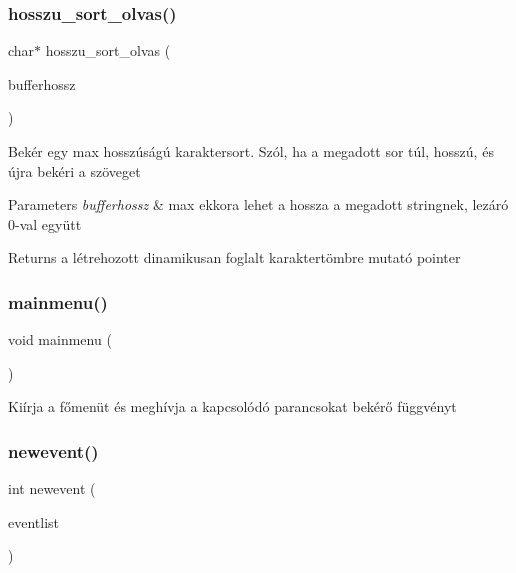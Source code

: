 \subsubsection{\texorpdfstring{hosszu\+\_\+sort\+\_\+olvas()}{hosszu\_sort\_olvas()}}
{\footnotesize\ttfamily char$\ast$ hosszu\+\_\+sort\+\_\+olvas (\begin{DoxyParamCaption}\item[{int}]{bufferhossz }\end{DoxyParamCaption})}

Bekér egy max hosszúságú karaktersort. Szól, ha a megadott sor túl, hosszú, és újra bekéri a szöveget 
\begin{DoxyParams}{Parameters}
{\em bufferhossz} & max ekkora lehet a hossza a megadott stringnek, lezáró 0-\/val együtt \\
\hline
\end{DoxyParams}
\begin{DoxyReturn}{Returns}
a létrehozott dinamikusan foglalt karaktertömbre mutató pointer 
\end{DoxyReturn}
\mbox{\label{group__menu_gac86d3169260f5cacd0f792743957b054}} 
\subsubsection{\texorpdfstring{mainmenu()}{mainmenu()}}
{\footnotesize\ttfamily void mainmenu (\begin{DoxyParamCaption}{ }\end{DoxyParamCaption})}

Kiírja a főmenüt és meghívja a kapcsolódó parancsokat bekérő függvényt \mbox{\label{group__menu_ga069c1b762e46bba28b1f38b87d8d58aa}} 
\subsubsection{\texorpdfstring{newevent()}{newevent()}}
{\footnotesize\ttfamily int newevent (\begin{DoxyParamCaption}\item[{\hyperlink{struct_event_list}{Event\+List} $\ast$}]{eventlist }\end{DoxyParamCaption})}

